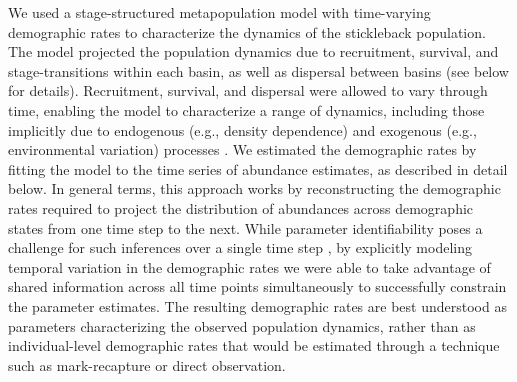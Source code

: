 \documentclass[11pt]{article}
\begin{document}
We used a stage-structured metapopulation model \citep{caswell2001matrix}
with time-varying demographic rates
to characterize the dynamics of the stickleback population.
The model projected the population dynamics due to
recruitment, survival, and stage-transitions within each basin,
as well as dispersal between basins (see below for details).
Recruitment, survival, and dispersal were allowed to vary through time,
enabling the model to characterize a range of dynamics,
including those implicitly due to endogenous (e.g., density dependence)
and exogenous (e.g., environmental variation) processes
\citep{zeng1998, ives2012}.
We estimated the demographic rates by
fitting the model to the time series of abundance estimates,
as described in detail below.
In general terms, this approach works by reconstructing the demographic rates required
to project the distribution of abundances across demographic states
from one time step to the next.
While parameter identifiability poses a challenge for such inferences 
over a single time step \citep{twombly1994, wood1994}, 
by explicitly modeling temporal variation in the demographic rates we were able
to take advantage of shared information across all time points simultaneously to
successfully constrain the parameter estimates.
The resulting demographic rates are best understood as parameters
characterizing the observed population dynamics,
rather than as individual-level demographic rates that would be estimated through a
technique such as mark-recapture or direct observation.
\end{document}
